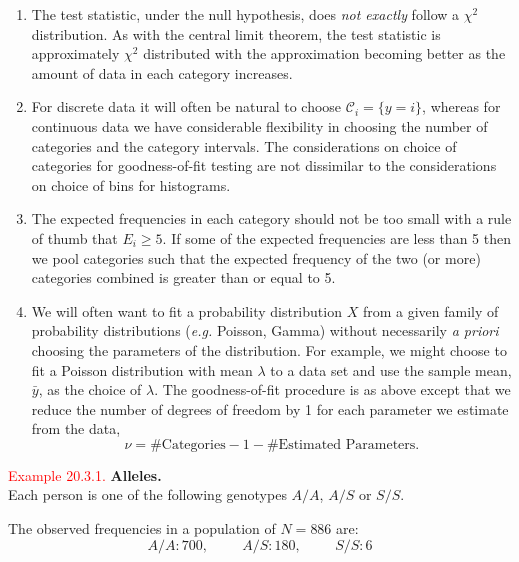 \documentclass[
]{book}
\providecommand{\tightlist}{%
  \setlength{\itemsep}{0pt}\setlength{\parskip}{0pt}}
\begin{document}
\begin{enumerate}
\def\labelenumi{\arabic{enumi}.}
\tightlist
\item
  The test statistic, under the null hypothesis, does \emph{not exactly} follow a \(\chi^2\) distribution. As with the central limit theorem, the test statistic is approximately \(\chi^2\) distributed with the approximation becoming better as the amount of data in each category increases.\\
\item
  For discrete data it will often be natural to choose \(\mathcal{C}_i = \{y = i\}\), whereas for continuous data we have considerable flexibility in choosing the number of categories and the category intervals. The considerations on choice of categories for goodness-of-fit testing are not dissimilar to the considerations on choice of bins for histograms.\\
\item
  The expected frequencies in each category should not be too small with a rule of thumb that \(E_i \geq 5\). If some of the expected frequencies are less than 5 then we pool categories such that the expected frequency of the two (or more) categories combined is greater than or equal to 5.\\
\item
  We will often want to fit a probability distribution \(X\) from a given family of probability distributions (\emph{e.g.} Poisson, Gamma) without necessarily \emph{a priori} choosing the parameters of the distribution. For example, we might choose to fit a Poisson distribution with mean \(\lambda\) to a data set and use the sample mean, \(\bar{y}\), as the choice of \(\lambda\). The goodness-of-fit procedure is as above except that we reduce the number of degrees of freedom by 1 for each parameter we estimate from the data,\\

  \[ \nu = \# \mbox{Categories} -1 - \# \mbox{Estimated Parameters}.  \]
\end{enumerate}

\leavevmode{}%
\textcolor{red}{Example 20.3.1.}
{\textbf{Alleles.}}\\
Each person is one of the following genotypes \(A/A\), \(A/S\) or \(S/S\).

The observed frequencies in a population of \(N=886\) are:\\

\[ A/A: 700, \hspace{1cm} A/S: 180, \hspace{1cm} S/S: 6 \]
\end{document}
